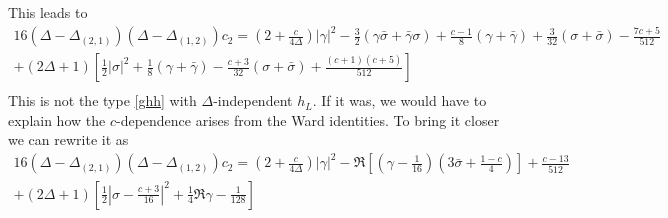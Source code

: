 \documentclass[12pt,a4paper]{article}
\begin{document}
This leads to 
\begin{multline}
 16(\Delta-\Delta_{(2,1)})(\Delta-\Delta_{(1,2)}) c_2 = \left(2+\frac{c}{4\Delta}\right)|\gamma|^2 
 -\tfrac32(\gamma\bar\sigma + \bar\gamma\sigma)+\tfrac{c-1}{8}(\gamma+\bar\gamma)+\tfrac{3}{32}(\sigma+\bar\sigma)-\tfrac{7c+5}{512}
 \\
 + (2\Delta+1)\left[\tfrac12|\sigma|^2 +\tfrac18 (\gamma+\bar\gamma) -\tfrac{c+3}{32}(\sigma+\bar\sigma)+\tfrac{(c+1)(c+5)}{512}\right] \\
\end{multline}
This is not the type \eqref{ghh} with $\Delta$-independent $h_L$. If it was, we would have to explain how the $c$-dependence arises from the Ward identities. To bring it closer we can rewrite it as 
\begin{multline}
 16(\Delta-\Delta_{(2,1)})(\Delta-\Delta_{(1,2)}) c_2 = \left(2+\frac{c}{4\Delta}\right)|\gamma|^2  -\Re\left[(\gamma-\tfrac{1}{16})(3\bar \sigma +\tfrac{1-c}{4})\right] +\tfrac{c-13}{512}
 \\ + (2\Delta+1)\left[\tfrac12 \left|\sigma -\tfrac{c+3}{16}\right|^2 +\tfrac14\Re\gamma -\tfrac{1}{128}\right]
\end{multline}





\end{document}
